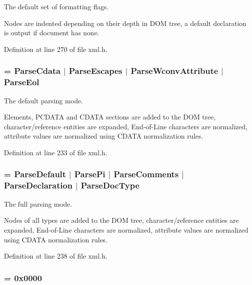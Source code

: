 The default set of formatting flags. 

Nodes are indented depending on their depth in DOM tree, a default declaration is output if document has none. 

Definition at line 270 of file xml.h.

\hypertarget{namespacephys_1_1xml_aa6b8f7f8c2322fd683a235b498834d60}{
\subsubsection[{ParseDefault}]{ = {\bf ParseCdata} $|$ {\bf ParseEscapes} $|$ {\bf ParseWconvAttribute} $|$ {\bf ParseEol}}}
\label{d9/d27/namespacephys_1_1xml_aa6b8f7f8c2322fd683a235b498834d60}


The default parsing mode. 

Elements, PCDATA and CDATA sections are added to the DOM tree, character/reference entities are expanded, End-\/of-\/Line characters are normalized, attribute values are normalized using CDATA normalization rules. 

Definition at line 233 of file xml.h.

\hypertarget{namespacephys_1_1xml_af1c356f1eb063a63efebd6c8a5241c63}{
\subsubsection[{ParseFull}]{ = {\bf ParseDefault} $|$ {\bf ParsePi} $|$ {\bf ParseComments} $|$ {\bf ParseDeclaration} $|$ ParseDocType}}
\label{d9/d27/namespacephys_1_1xml_af1c356f1eb063a63efebd6c8a5241c63}


The full parsing mode. 

Nodes of all types are added to the DOM tree, character/reference entities are expanded, End-\/of-\/Line characters are normalized, attribute values are normalized using CDATA normalization rules. 

Definition at line 238 of file xml.h.

\hypertarget{namespacephys_1_1xml_ab660837afbc6aaab22425d8d23e8f2e4}{
\subsubsection[{ParseMinimal}]{ = 0x0000}}
\label{d9/d27/namespacephys_1_1xml_ab660837afbc6aaab22425d8d23e8f2e4}


